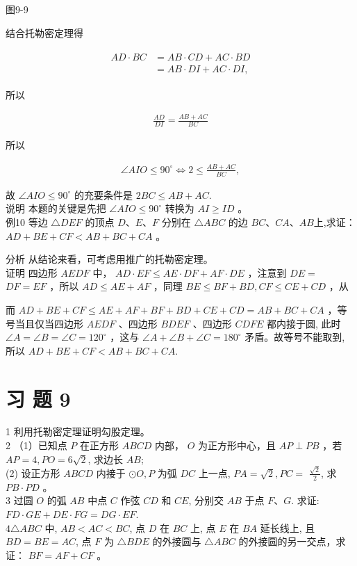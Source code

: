 \documentclass[10pt]{article}
\begin{document}
图9-9

结合托勒密定理得

\begin{align*}
\begin{aligned}
A D \cdot B C & =A B \cdot C D+A C \cdot B D \\
& =A B \cdot D I+A C \cdot D I,
\end{aligned}
\end{align*}

所以

\begin{align*}
\frac{A D}{D I}=\frac{A B+A C}{B C}
\end{align*}

所以

\begin{align*}
\angle A I O \leqslant 90^{\circ} \Leftrightarrow 2 \leqslant \frac{A B+A C}{B C},
\end{align*}

故 $\angle A I O \leqslant 90^{\circ}$ 的充要条件是 $2 B C \leqslant A B+A C$.\\
说明 本题的关键是先把 $\angle A I O \leqslant 90^{\circ}$ 转换为 $A I \geqslant I D$ 。\\
例10 等边 $\triangle D E F$ 的顶点 $D 、 E 、 F$ 分别在 $\triangle A B C$ 的边 $B C 、 C A 、 A B$上,求证： $A D+B E+C F<A B+B C+C A$ 。

分析 从结论来看，可考虑用推广的托勒密定理。\\
证明 四边形 $A E D F$ 中， $A D \cdot E F \leqslant A E \cdot D F+A F \cdot D E$ ，注意到 $D E=$ $D F=E F$ ，所以 $A D \leqslant A E+A F$ ，同理 $B E \leqslant B F+B D, C F \leqslant C E+C D$ ，从

而 $A D+B E+C F \leqslant A E+A F+B F+B D+C E+C D=A B+B C+C A$ ，等号当且仅当四边形 $A E D F$ 、四边形 $B D E F$ 、四边形 $C D F E$ 都内接于圆, 此时 $\angle A=\angle B=\angle C=120^{\circ}$ ，这与 $\angle A+\angle B+\angle C=180^{\circ}$ 矛盾。故等号不能取到, 所以 $A D+B E+C F<A B+B C+C A$.

\section*{习 题 9}
1 利用托勒密定理证明勾股定理。\\
2 （1）已知点 $P$ 在正方形 $A B C D$ 内部， $O$ 为正方形中心，且 $A P \perp P B$ ，若 $A P=4, P O=6 \sqrt{2}$, 求边长 $A B$;\\
(2) 设正方形 $A B C D$ 内接于 $\odot O, P$ 为弧 $D C$ 上一点, $P A=\sqrt{2}, P C=$ $\frac{\sqrt{2}}{2}$, 求 $P B \cdot P D$ 。\\
3 过圆 $O$ 的弧 $A B$ 中点 $C$ 作弦 $C D$ 和 $C E$, 分别交 $A B$ 于点 $F 、 G$. 求证: $F D \cdot G E+D E \cdot F G=D G \cdot E F$.\\
$4 \triangle A B C$ 中, $A B<A C<B C$, 点 $D$ 在 $B C$ 上, 点 $E$ 在 $B A$ 延长线上, 且 $B D=B E=A C$, 点 $F$ 为 $\triangle B D E$ 的外接圆与 $\triangle A B C$ 的外接圆的另一交点，求证： $B F=A F+C F$ 。
\end{document}
